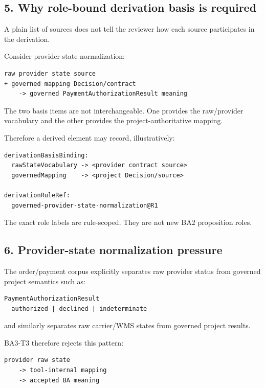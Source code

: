 \documentclass[11pt,a4paper]{article}
\begin{document}
\subsection{5. Why role-bound derivation basis is
required}\label{why-role-bound-derivation-basis-is-required}

A plain list of sources does not tell the reviewer how each source
participates in the derivation.

Consider provider-state normalization:

\begin{verbatim}
raw provider state source
+ governed mapping Decision/contract
    -> governed PaymentAuthorizationResult meaning
\end{verbatim}

The two basis items are not interchangeable. One provides the
raw/provider vocabulary and the other provides the project-authoritative
mapping.

Therefore a derived element may record, illustratively:

\begin{verbatim}
derivationBasisBinding:
  rawStateVocabulary -> <provider contract source>
  governedMapping    -> <project Decision/source>

derivationRuleRef:
  governed-provider-state-normalization@R1
\end{verbatim}

The exact role labels are rule-scoped. They are not new BA2 proposition
roles.

\subsection{6. Provider-state normalization
pressure}\label{provider-state-normalization-pressure}

The order/payment corpus explicitly separates raw provider status from
governed project semantics such as:

\begin{verbatim}
PaymentAuthorizationResult
  authorized | declined | indeterminate
\end{verbatim}

and similarly separates raw carrier/WMS states from governed project
results.

BA3-T3 therefore rejects this pattern:

\begin{verbatim}
provider raw state
    -> tool-internal mapping
    -> accepted BA meaning
\end{verbatim}
\end{document}
